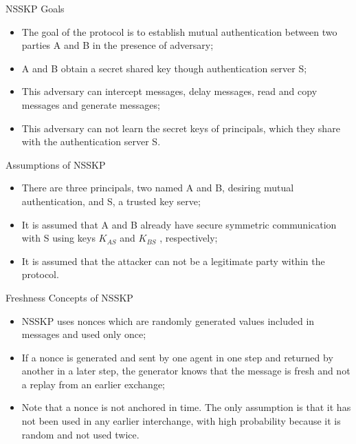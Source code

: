 \documentclass[12pt,table,xcolor={dvipsnames}]{beamer}
\begin{document}
\begin{frame}{NSSKP Goals}
\begin{itemize}
\item The goal of the protocol is to establish mutual authentication between two parties A and B in the presence of adversary;\pause
\item  A and B obtain a secret shared key though authentication server S;\pause
\item This adversary can intercept messages, delay messages, read and copy messages and generate messages;\pause
\item This adversary can not learn the secret keys of principals, which they share with the authentication server S.
\end{itemize}
\end{frame}

\begin{frame}{Assumptions of NSSKP}
\begin{itemize}
\item There are three principals, two named A and B, desiring mutual authentication, and
S, a trusted key serve;\pause
\item It is assumed that A and B already have secure symmetric communication with
S using keys $K_{AS}$ and $K_{BS}$ , respectively;\pause
\item It is assumed that the attacker can not be a legitimate party within the protocol.
\end{itemize}
\end{frame}

\begin{frame}{Freshness Concepts of NSSKP}
\begin{itemize}
\item NSSKP uses nonces which are randomly generated values included in messages and used only once;\pause
\item If a nonce is generated and sent by one agent in one step and returned by another in a later step, the generator knows that the message is fresh and not a replay from an earlier exchange;\pause
\item Note that a nonce is not anchored in time. The only assumption is that it has not been used in any earlier interchange, with high probability because it is random and not used twice.
\end{itemize}
\end{frame}
\end{document}
